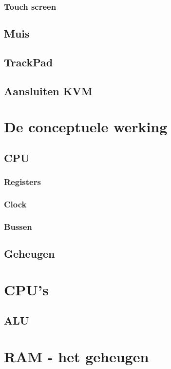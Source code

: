 \documentclass[a4paper,12pt,twoside,openright,titlepage]{book}
\begin{document}
\subsection{Touch screen}
\section{Muis}
\section{TrackPad}
\section{Aansluiten KVM}

\chapter{De conceptuele werking}
\section{CPU}

\subsection{Registers}
\subsection{Clock}
\subsection{Bussen}
\section{Geheugen}

\chapter{CPU's}
\section{ALU}

\chapter{RAM - het geheugen}
\end{document}
